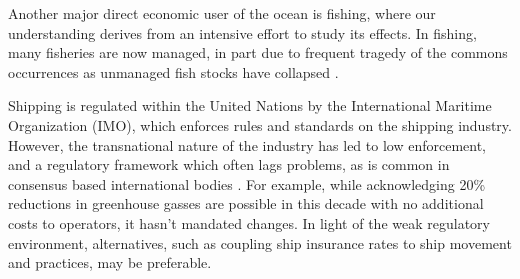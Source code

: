 

Another major direct economic user of the ocean is fishing, where our understanding derives from an intensive effort to study its effects. %
In fishing, many fisheries are now managed, \cite{worm2009rebuilding} in part due to frequent tragedy of the commons occurrences as unmanaged fish stocks have collapsed \cite{costello2012status}. %

  Shipping is regulated within the United Nations by the International Maritime Organization (IMO), which enforces rules and standards on the shipping industry. However, the transnational nature of the industry has led to low enforcement, and a regulatory framework which often lags problems, as is common in consensus based international bodies \cite{cogan2009representation}. %
  For example, while acknowledging \cite{imo2009} 20\% reductions in greenhouse gasses are possible in this decade with no additional costs to operators, it hasn't mandated changes.  In light of the weak regulatory environment, alternatives, such as coupling ship insurance rates to ship movement and practices, may be preferable.


